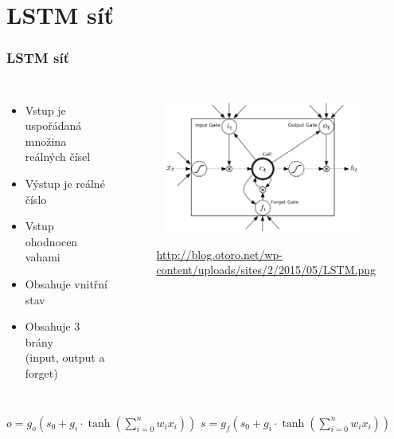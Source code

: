 \documentclass{beamer}
\begin{document}


	\section{LSTM síť}
	\begin{frame}
	\frametitle{LSTM síť}
		\begin{columns}[t]
			\column{5cm}
			\begin{itemize}
				\item Vstup je uspořádaná množina reálných čísel
				\item Výstup je reálné číslo
				\item Vstup ohodnocen vahami 
				\item Obsahuje vnitřní stav
				\item Obsahuje 3 brány\\(input, output a forget)
			\end{itemize}
			\column{7cm}
			\begin{figure}
				\centering
				\includegraphics[width=7cm, height=4.3cm]{LSTM-cell.png}\\ %
				\caption{{\fontsize{5}{6}\selectfont\url{http://blog.otoro.net/wp-content/uploads/sites/2/2015/05/LSTM.png}}}
			\end{figure}
		\end{columns}
		\begin{columns}
			\column{5cm}
				$o = g_o(s_0 + g_i \cdot \tanh(\sum\limits_{i=0}^nw_ix_i))$
			\column{5cm}
				$s = g_f(s_0 + g_i \cdot \tanh(\sum\limits_{i=0}^nw_ix_i))$
		\end{columns}
	\end{frame}
	
	
\end{document}
